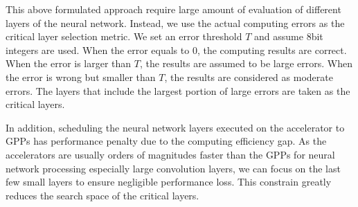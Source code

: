 This above formulated approach require large amount of evaluation of 
different layers of the neural network. Instead, we use the actual 
computing errors as the critical layer selection metric. We set an 
error threshold $T$ and assume 8bit integers are used. 
When the error equals to 0, the computing results are correct. 
When the error is larger than $T$, the results are assumed to be large errors.
When the error is wrong but smaller than $T$, the results are considered 
as moderate errors. The layers that include the largest portion of large errors 
are taken as the critical layers.

In addition, scheduling the neural network layers executed 
on the accelerator to GPPs has performance penalty due to the 
computing efficiency gap. As the accelerators are usually 
orders of magnitudes faster than the GPPs for neural network 
processing especially large convolution layers, we can focus on 
the last few small layers to ensure negligible performance 
loss. This constrain greatly reduces the search space
of the critical layers. 


